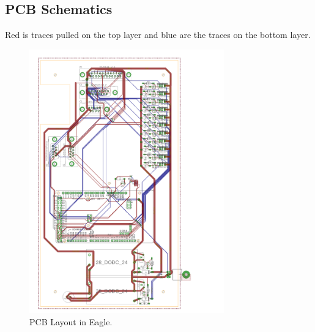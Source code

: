 \subsection{PCB Schematics}
\label{sec:pcbSchematics}
Red is traces pulled on the top layer and blue are the traces on the bottom layer.
\begin{figure}[H]
    \centering
    \includegraphics[width=0.75\textwidth]{appendix/img/PCB_layout_rev1.png}
    \caption{PCB Layout in Eagle.}
    \label{fig:PCBinEagle}
\end{figure}
